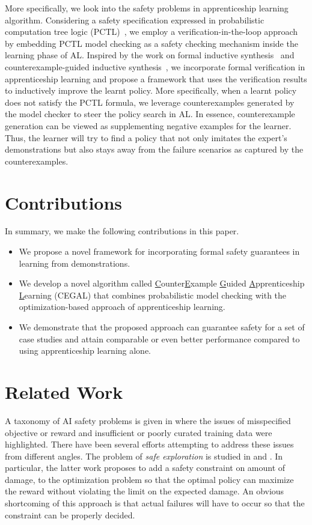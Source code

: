 More specifically, we look into the safety problems in apprenticeship learning algorithm. Considering a safety specification expressed in probabilistic computation tree logic (PCTL)~\cite{Hansson1994}, we employ a verification-in-the-loop approach by embedding PCTL model checking as a safety checking mechanism inside the learning phase of AL. Inspired by the work on formal inductive synthesis~\cite{jha-ai2017} and counterexample-guided inductive synthesis~\cite{CEGIS}, we incorporate formal verification in apprenticeship learning and propose a framework that uses the verification results to  inductively improve the learnt policy. 
More specifically, when a learnt policy does not satisfy the PCTL formula, we leverage counterexamples generated by the model checker to steer the policy search in AL. 
In essence, counterexample generation can be viewed as supplementing negative examples for the learner. 
Thus, the learner will try to find a policy that not only imitates the expert's demonstrations but also stays away from the failure scenarios as captured by the counterexamples. 


\section{Contributions}
In summary, we make the following contributions in this paper. 
\begin{itemize}
\item We propose a novel framework for incorporating formal safety guarantees in learning from demonstrations.
\item We develop a novel algorithm called \underline{C}ounter\underline{E}xample \underline{G}uided \underline{A}pprenticeship \underline{L}earning (CEGAL) that combines probabilistic model checking with the optimization-based approach of apprenticeship learning. 
\item We demonstrate that the proposed approach can guarantee safety for a set of case studies and attain comparable or even better performance compared to using apprenticeship learning alone.
\end{itemize}


\section{Related Work}
A taxonomy of AI safety problems is given in \cite{AmodeiOSCSM16} where the issues of misspecified objective or reward and insufficient or poorly curated training data were highlighted. There have been several efforts attempting to address these issues from different angles. The problem of {\it safe exploration} is studied in \cite{moldovan2012safe} and \cite{DBLP:journals/corr/HeldMZSA17}. In particular, the latter work proposes to add a safety constraint on amount of damage, to the optimization problem so that the optimal policy can maximize the reward without violating the limit on the expected damage. An obvious shortcoming of this approach is that actual failures will have to occur so that the constraint can be properly decided.

